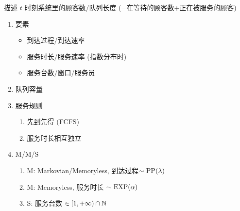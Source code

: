 \begin{example}[排队系统]
    描述 $t$ 时刻系统里的顾客数/队列长度 (=在等待的顾客数+正在被服务的顾客)
    \begin{enumerate}
        \item 要素
        \begin{itemize}
            \item 到达过程/到达速率
            \item 服务时长/服务速率 (指数分布时)
            \item 服务台数/窗口/服务员
        \end{itemize}
        \item 队列容量
        \item 服务规则
        \begin{enumerate}
            \item 先到先得 (FCFS)
            \item 服务时长相互独立
        \end{enumerate}
        \item M/M/S
        \begin{enumerate}
            \item M: Markovian/Memoryless, 到达过程$\sim \operatorname{PP}(\lambda)$
            \item M: Memoryless, 服务时长 $\sim\operatorname{EXP}(\alpha)$
            \item S: 服务台数 $\in [1,+\infty)\cap \mathbb{N}$
        \end{enumerate}
    \end{enumerate}
\end{example}

